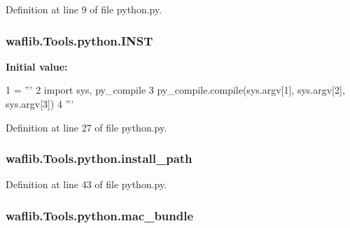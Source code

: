 Definition at line 9 of file python.\+py.

\subsubsection[{\texorpdfstring{I\+N\+ST}{INST}}]{ waflib.\+Tools.\+python.\+I\+N\+ST}\hypertarget{namespacewaflib_1_1_tools_1_1python_a26b4c5e9bb844e74f1e69c6351dd25c8}{}\label{namespacewaflib_1_1_tools_1_1python_a26b4c5e9bb844e74f1e69c6351dd25c8}
{\bfseries Initial value\+:}
\begin{DoxyCode}
1 = \textcolor{stringliteral}{'''}
2 \textcolor{stringliteral}{import sys, py\_compile}
3 \textcolor{stringliteral}{py\_compile.compile(sys.argv[1], sys.argv[2], sys.argv[3])}
4 \textcolor{stringliteral}{'''}
\end{DoxyCode}


Definition at line 27 of file python.\+py.

\subsubsection[{\texorpdfstring{install\+\_\+path}{install_path}}]{\setlength{\rightskip}{0pt plus 5cm}waflib.\+Tools.\+python.\+install\+\_\+path}\hypertarget{namespacewaflib_1_1_tools_1_1python_a53730bdd6b53dbcc1dc4d3e20ab20238}{}\label{namespacewaflib_1_1_tools_1_1python_a53730bdd6b53dbcc1dc4d3e20ab20238}


Definition at line 43 of file python.\+py.

\subsubsection[{\texorpdfstring{mac\+\_\+bundle}{mac_bundle}}]{\setlength{\rightskip}{0pt plus 5cm}waflib.\+Tools.\+python.\+mac\+\_\+bundle}\hypertarget{namespacewaflib_1_1_tools_1_1python_ac52a411fe227339221e78a6abd0b363b}{}\label{namespacewaflib_1_1_tools_1_1python_ac52a411fe227339221e78a6abd0b363b}


